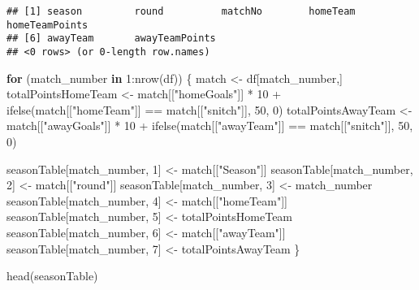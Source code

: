 \documentclass[
]{article}
\newenvironment{Shaded}{\begin{snugshade}}{\end{snugshade}}
\newcommand{\ControlFlowTok}[1]{\textcolor[rgb]{0.13,0.29,0.53}{\textbf{#1}}}
\newcommand{\DecValTok}[1]{\textcolor[rgb]{0.00,0.00,0.81}{#1}}
\newcommand{\FunctionTok}[1]{\textcolor[rgb]{0.00,0.00,0.00}{#1}}
\newcommand{\NormalTok}[1]{#1}
\newcommand{\OtherTok}[1]{\textcolor[rgb]{0.56,0.35,0.01}{#1}}
\newcommand{\SpecialCharTok}[1]{\textcolor[rgb]{0.00,0.00,0.00}{#1}}
\newcommand{\StringTok}[1]{\textcolor[rgb]{0.31,0.60,0.02}{#1}}
\begin{document}
\begin{verbatim}
## [1] season         round          matchNo        homeTeam       homeTeamPoints
## [6] awayTeam       awayTeamPoints
## <0 rows> (or 0-length row.names)
\end{verbatim}

\begin{Shaded}
\begin{Highlighting}[]
\ControlFlowTok{for}\NormalTok{ (match\_number }\ControlFlowTok{in} \DecValTok{1}\SpecialCharTok{:}\FunctionTok{nrow}\NormalTok{(df)) \{}
\NormalTok{  match }\OtherTok{\textless{}{-}}\NormalTok{ df[match\_number,]}
\NormalTok{  totalPointsHomeTeam }\OtherTok{\textless{}{-}}\NormalTok{ match[[}\StringTok{"homeGoals"}\NormalTok{]] }\SpecialCharTok{*} \DecValTok{10} \SpecialCharTok{+} \FunctionTok{ifelse}\NormalTok{(match[[}\StringTok{"homeTeam"}\NormalTok{]] }\SpecialCharTok{==}\NormalTok{ match[[}\StringTok{"snitch"}\NormalTok{]], }\DecValTok{50}\NormalTok{, }\DecValTok{0}\NormalTok{)}
\NormalTok{  totalPointsAwayTeam }\OtherTok{\textless{}{-}}\NormalTok{ match[[}\StringTok{"awayGoals"}\NormalTok{]] }\SpecialCharTok{*} \DecValTok{10} \SpecialCharTok{+} \FunctionTok{ifelse}\NormalTok{(match[[}\StringTok{"awayTeam"}\NormalTok{]] }\SpecialCharTok{==}\NormalTok{ match[[}\StringTok{"snitch"}\NormalTok{]], }\DecValTok{50}\NormalTok{, }\DecValTok{0}\NormalTok{)}

\NormalTok{  seasonTable[match\_number, }\DecValTok{1}\NormalTok{] }\OtherTok{\textless{}{-}}\NormalTok{ match[[}\StringTok{"Season"}\NormalTok{]]}
\NormalTok{  seasonTable[match\_number, }\DecValTok{2}\NormalTok{] }\OtherTok{\textless{}{-}}\NormalTok{ match[[}\StringTok{"round"}\NormalTok{]]}
\NormalTok{  seasonTable[match\_number, }\DecValTok{3}\NormalTok{] }\OtherTok{\textless{}{-}}\NormalTok{ match\_number}
\NormalTok{  seasonTable[match\_number, }\DecValTok{4}\NormalTok{] }\OtherTok{\textless{}{-}}\NormalTok{ match[[}\StringTok{"homeTeam"}\NormalTok{]]}
\NormalTok{  seasonTable[match\_number, }\DecValTok{5}\NormalTok{] }\OtherTok{\textless{}{-}}\NormalTok{ totalPointsHomeTeam}
\NormalTok{  seasonTable[match\_number, }\DecValTok{6}\NormalTok{] }\OtherTok{\textless{}{-}}\NormalTok{ match[[}\StringTok{"awayTeam"}\NormalTok{]]}
\NormalTok{  seasonTable[match\_number, }\DecValTok{7}\NormalTok{] }\OtherTok{\textless{}{-}}\NormalTok{ totalPointsAwayTeam}
\NormalTok{\}}

\FunctionTok{head}\NormalTok{(seasonTable)}
\end{Highlighting}
\end{Shaded}
\end{document}
